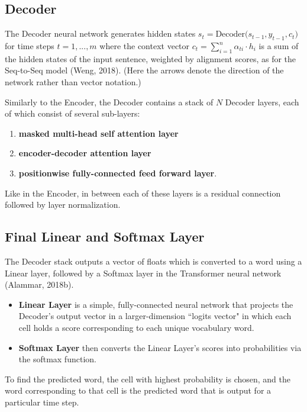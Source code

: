 \subsection{Decoder}


The Decoder neural network generates hidden states $s_t = \text{Decoder}\Big( s_{t-1}, y_{t-1}, c_t \Big)$ for time steps $t = 1,..., m$ where the context vector $c_t = \sum_{i=1}^n \alpha_{ti} \cdot h_i$ is a sum of the hidden states of the input sentence, weighted by alignment scores, as for the Seq-to-Seq model (Weng, 2018). (Here the arrows denote the direction of the network rather than vector notation.)

Similarly to the Encoder, the Decoder contains a stack of $N$ Decoder layers, each of which consist of several sub-layers:
\begin{enumerate}
    \item \textbf{masked multi-head self attention layer}
    \item \textbf{encoder-decoder attention layer} 
    \item \textbf{positionwise fully-connected feed forward layer}. 
\end{enumerate}

Like in the Encoder, in between each of these layers is a residual connection followed by layer normalization. 




\subsection{Final Linear and Softmax Layer}


The Decoder stack outputs a vector of floats which is converted to a word using a Linear layer, followed by a Softmax layer in the Transformer neural network (Alammar, 2018b). 
\begin{itemize}
    \item \textbf{Linear Layer} is a simple, fully-connected neural network that projects the Decoder's output vector in a larger-dimension ``logits vector" in which each cell holds a score corresponding to each unique vocabulary word. 
    
    \item \textbf{Softmax Layer} then converts the Linear Layer's scores into probabilities via the softmax function. 
\end{itemize}

To find the predicted word, the cell with highest probability is chosen, and the word corresponding to that cell is the predicted word that is output for a particular time step.




